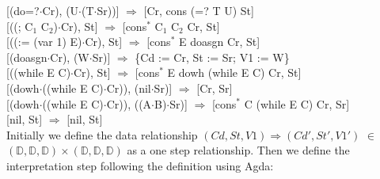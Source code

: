 \documentclass{jfrarticle}
\begin{document}
\indent\hspace{0.5cm}[(do=?$\cdot$Cr), (U$\cdot$(T$\cdot$Sr))]\hspace{1cm} $\Rightarrow$ \hspace{0.5cm} [Cr, cons (=? T U) St]\\
\indent\hspace{0.5cm}[((; C$_1$ C$_2$)$\cdot$Cr), St]\hspace{1.8cm} $\Rightarrow$ \hspace{0.5cm} [cons$^{*}$ C$_1$ C$_2$ Cr, St]\\
\indent\hspace{0.5cm}[((:= (var 1) E)$\cdot$Cr), St]\hspace{0.9cm} $\Rightarrow$ \hspace{0.5cm} [cons$^{*}$ E doasgn Cr, St]\\
\indent\hspace{0.5cm}[(doasgn$\cdot$Cr), (W$\cdot$Sr)]\hspace{1.35cm} $\Rightarrow$ \hspace{0.5cm} \{Cd := Cr, St := Sr; V1 := W\}\\
\indent\hspace{0.5cm}[((while E C)$\cdot$Cr), St]\hspace{1.35cm} $\Rightarrow$ \hspace{0.5cm} [cons$^{*}$ E dowh (while E C) Cr, St]\\
\indent\hspace{0.5cm}[(dowh$\cdot$((while E C)$\cdot$Cr)), (nil$\cdot$Sr)]\hspace{0.85cm} $\Rightarrow$ \hspace{0.5cm} [Cr, Sr]\\
\indent\hspace{0.5cm}[(dowh$\cdot$((while E C)$\cdot$Cr)), ((A$\cdot$B)$\cdot$Sr)]\hspace{0.3cm} $\Rightarrow$ \hspace{0.5cm} [cons$^{*}$ C (while E C) Cr, Sr]\\
\indent\hspace{0.5cm}[nil, St]\hspace{3.9cm} $\Rightarrow$ \hspace{0.5cm} [nil, St]\\
Initially we define the data relationship $(Cd,St,V1)\Rightarrow(Cd',St',V1')$ $\in$  $(\mathds{D},\mathds{D},\mathds{D})\times (\mathds{D},\mathds{D},\mathds{D})$ as a one step relationship.
Then we define the interpretation step following the definition using Agda:
\end{document}
